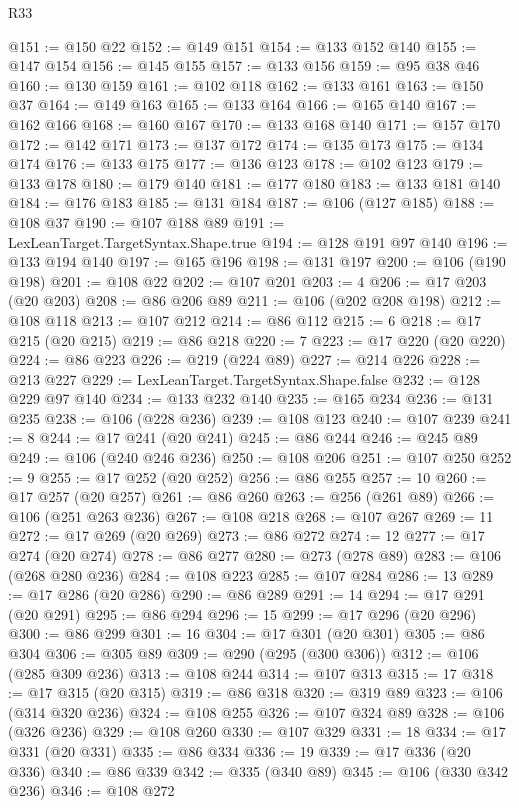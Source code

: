 \begin{lexlean}{R33}
\begin{coremodule}
@151 := @150 @22
@152 := @149 @151
@154 := @133 @152 @140
@155 := @147 @154
@156 := @145 @155
@157 := @133 @156
@159 := @95 @38 @46
@160 := @130 @159
@161 := @102 @118
@162 := @133 @161
@163 := @150 @37
@164 := @149 @163
@165 := @133 @164
@166 := @165 @140
@167 := @162 @166
@168 := @160 @167
@170 := @133 @168 @140
@171 := @157 @170
@172 := @142 @171
@173 := @137 @172
@174 := @135 @173
@175 := @134 @174
@176 := @133 @175
@177 := @136 @123
@178 := @102 @123
@179 := @133 @178
@180 := @179 @140
@181 := @177 @180
@183 := @133 @181 @140
@184 := @176 @183
@185 := @131 @184
@187 := @106 (@127 @185)
@188 := @108 @37
@190 := @107 @188 @89
@191 := LexLeanTarget.TargetSyntax.Shape.true
@194 := @128 @191 @97 @140
@196 := @133 @194 @140
@197 := @165 @196
@198 := @131 @197
@200 := @106 (@190 @198)
@201 := @108 @22
@202 := @107 @201
@203 := 4
@206 := @17 @203 (@20 @203)
@208 := @86 @206 @89
@211 := @106 (@202 @208 @198)
@212 := @108 @118
@213 := @107 @212
@214 := @86 @112
@215 := 6
@218 := @17 @215 (@20 @215)
@219 := @86 @218
@220 := 7
@223 := @17 @220 (@20 @220)
@224 := @86 @223
@226 := @219 (@224 @89)
@227 := @214 @226
@228 := @213 @227
@229 := LexLeanTarget.TargetSyntax.Shape.false
@232 := @128 @229 @97 @140
@234 := @133 @232 @140
@235 := @165 @234
@236 := @131 @235
@238 := @106 (@228 @236)
@239 := @108 @123
@240 := @107 @239
@241 := 8
@244 := @17 @241 (@20 @241)
@245 := @86 @244
@246 := @245 @89
@249 := @106 (@240 @246 @236)
@250 := @108 @206
@251 := @107 @250
@252 := 9
@255 := @17 @252 (@20 @252)
@256 := @86 @255
@257 := 10
@260 := @17 @257 (@20 @257)
@261 := @86 @260
@263 := @256 (@261 @89)
@266 := @106 (@251 @263 @236)
@267 := @108 @218
@268 := @107 @267
@269 := 11
@272 := @17 @269 (@20 @269)
@273 := @86 @272
@274 := 12
@277 := @17 @274 (@20 @274)
@278 := @86 @277
@280 := @273 (@278 @89)
@283 := @106 (@268 @280 @236)
@284 := @108 @223
@285 := @107 @284
@286 := 13
@289 := @17 @286 (@20 @286)
@290 := @86 @289
@291 := 14
@294 := @17 @291 (@20 @291)
@295 := @86 @294
@296 := 15
@299 := @17 @296 (@20 @296)
@300 := @86 @299
@301 := 16
@304 := @17 @301 (@20 @301)
@305 := @86 @304
@306 := @305 @89
@309 := @290 (@295 (@300 @306))
@312 := @106 (@285 @309 @236)
@313 := @108 @244
@314 := @107 @313
@315 := 17
@318 := @17 @315 (@20 @315)
@319 := @86 @318
@320 := @319 @89
@323 := @106 (@314 @320 @236)
@324 := @108 @255
@326 := @107 @324 @89
@328 := @106 (@326 @236)
@329 := @108 @260
@330 := @107 @329
@331 := 18
@334 := @17 @331 (@20 @331)
@335 := @86 @334
@336 := 19
@339 := @17 @336 (@20 @336)
@340 := @86 @339
@342 := @335 (@340 @89)
@345 := @106 (@330 @342 @236)
@346 := @108 @272

\end{coremodule}
\end{lexlean}
